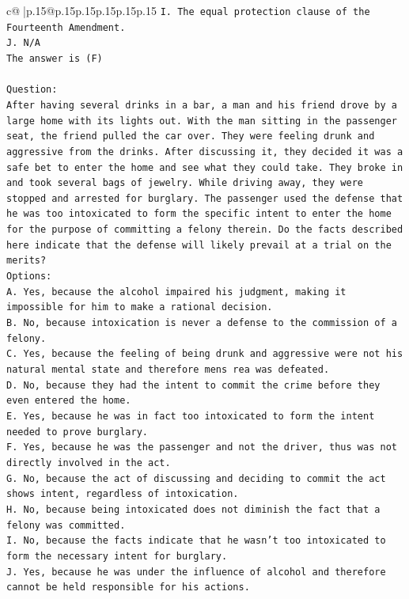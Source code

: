 \documentclass{article}
\begin{document}
{\begin{supertabular}{c@{$\;$}|p{.15\linewidth}@{}p{.15\linewidth}p{.15\linewidth}p{.15\linewidth}p{.15\linewidth}p{.15\linewidth}}
{{{\texttt{I. The equal protection clause of the Fourteenth Amendment.} \\
\texttt{J. N/A} \\
\texttt{The answer is (F)} \\
\\ 
\texttt{Question:} \\
\texttt{After having several drinks in a bar, a man and his friend drove by a large home with its lights out. With the man sitting in the passenger seat, the friend pulled the car over. They were feeling drunk and aggressive from the drinks. After discussing it, they decided it was a safe bet to enter the home and see what they could take. They broke in and took several bags of jewelry. While driving away, they were stopped and arrested for burglary. The passenger used the defense that he was too intoxicated to form the specific intent to enter the home for the purpose of committing a felony therein. Do the facts described here indicate that the defense will likely prevail at a trial on the merits?} \\
\texttt{Options:} \\
\texttt{A. Yes, because the alcohol impaired his judgment, making it impossible for him to make a rational decision.} \\
\texttt{B. No, because intoxication is never a defense to the commission of a felony.} \\
\texttt{C. Yes, because the feeling of being drunk and aggressive were not his natural mental state and therefore mens rea was defeated.} \\
\texttt{D. No, because they had the intent to commit the crime before they even entered the home.} \\
\texttt{E. Yes, because he was in fact too intoxicated to form the intent needed to prove burglary.} \\
\texttt{F. Yes, because he was the passenger and not the driver, thus was not directly involved in the act.} \\
\texttt{G. No, because the act of discussing and deciding to commit the act shows intent, regardless of intoxication.} \\
\texttt{H. No, because being intoxicated does not diminish the fact that a felony was committed.} \\
\texttt{I. No, because the facts indicate that he wasn't too intoxicated to form the necessary intent for burglary.} \\
\texttt{J. Yes, because he was under the influence of alcohol and therefore cannot be held responsible for his actions.} \\
            }
        }
    }
     \\ \\


\end{supertabular}}
\end{document}
